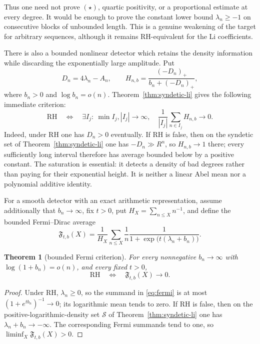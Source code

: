 \documentclass[11pt]{amsart}
\newtheorem{theorem}{Theorem}[section]
\theoremstyle{definition}
\theoremstyle{remark}
\theoremstyle{definition}
\newcommand{\RH}{\mathrm{RH}}
\begin{document}
Thus one need not prove $(\star)$, quartic positivity, or a proportional estimate at every degree.  It
would be enough to prove the constant lower bound $\lambda_n\ge-1$ on consecutive blocks of
unbounded length.  This is a genuine weakening of the target for arbitrary sequences, although
it remains RH-equivalent for the Li coefficients.

There is also a bounded nonlinear detector which retains the density information while discarding
the exponentially large amplitude.  Put
\[
 D_n=4\lambda_n-A_n,\qquad
 H_{n,b}=\frac{(-D_n)_+}{b_n+(-D_n)_+},
\]
where $b_n>0$ and $\log b_n=o(n)$.  Theorem~\ref{thm:syndetic-li} gives the following immediate
criterion:
\begin{equation}\label{eq:saturated-barrier}
 \boxed{\ \RH\quad\Longleftrightarrow\quad
 \exists I_j:\ \min I_j,|I_j|\to\infty,
 \quad \frac{1}{|I_j|}\sum_{n\in I_j}H_{n,b}\longrightarrow0.\ }
\end{equation}
Indeed, under RH one has $D_n>0$ eventually.  If RH is false, then on the syndetic set of
Theorem~\ref{thm:syndetic-li} one has $-D_n\gg R^n$, so $H_{n,b}\to1$ there; every sufficiently
long interval therefore has average bounded below by a positive constant.  The saturation is
essential: it detects a density of bad degrees rather than paying for their exponential height.
It is neither a linear Abel mean nor a polynomial additive identity.

For a smooth detector with an exact arithmetic representation, assume additionally that
$b_n\to\infty$, fix $t>0$, put $H_X=\sum_{n\le X}n^{-1}$, and define the bounded Fermi--Dirac
average
\begin{equation}\label{eq:fermi}
 \mathfrak F_{t,b}(X)=\frac1{H_X}\sum_{n\le X}\frac1n
       \frac1{1+\exp\bigl(t(\lambda_n+b_n)\bigr)}.
\end{equation}

\begin{theorem}[bounded Fermi criterion]\label{thm:fermi}
For every nonnegative $b_n\to\infty$ with $\log(1+b_n)=o(n)$, and every fixed $t>0$,
\begin{equation}\label{eq:fermi-bound}
   \boxed{\ \RH\quad\Longleftrightarrow\quad
           \mathfrak F_{t,b}(X)\longrightarrow0.\ }
\end{equation}
\end{theorem}

\begin{proof}
Under RH, $\lambda_n\ge0$, so the summand in \eqref{eq:fermi} is at most
$(1+e^{tb_n})^{-1}\to0$; its logarithmic mean tends to zero.  If RH is false, then on the
positive-logarithmic-density set $\mathcal S$ of Theorem~\ref{thm:syndetic-li} one has
$\lambda_n+b_n\to-\infty$.  The corresponding Fermi summands tend to one, so
$\liminf_X\mathfrak F_{t,b}(X)>0$.
\end{proof}
\end{document}
